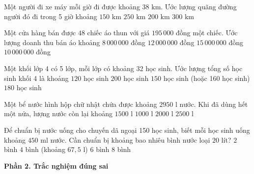 \begin{ex} %
Một người đi xe máy mỗi giờ đi được khoảng $38\text{ km}$. Ước lượng quãng đường người đó đi trong 5 giờ khoảng
\choice
{$150\text{ km}$}
{$250\text{ km}$}
{\True $200\text{ km}$}
{$300\text{ km}$}
\end{ex}

\begin{ex} %
Một cửa hàng bán được $48$ chiếc áo thun với giá $195\,000$ đồng một chiếc. Ước lượng doanh thu bán áo khoảng
\choice
{$8\,000\,000$ đồng}
{$12\,000\,000$ đồng}
{$15\,000\,000$ đồng}
{\True $10\,000\,000$ đồng}
\end{ex}

\begin{ex} %
Một khối lớp 4 có 5 lớp, mỗi lớp có khoảng 32 học sinh. Ước lượng tổng số học sinh khối 4 là khoảng
\choice
{$120$ học sinh}
{$200$ học sinh}
{\True $150$ học sinh (hoặc 160 học sinh)}
{$180$ học sinh}
\end{ex}

\begin{ex} %
Một bể nước hình hộp chữ nhật chứa được khoảng $2950\text{ l}$ nước. Khi đã dùng hết một nửa, lượng nước còn lại khoảng
\choice
{\True $1500\text{ l}$}
{$1000\text{ l}$}
{$2000\text{ l}$}
{$2500\text{ l}$}
\end{ex}

\begin{ex} %
Để chuẩn bị nước uống cho chuyến dã ngoại 150 học sinh, biết mỗi học sinh uống khoảng $450\text{ ml}$ nước. Cần chuẩn bị khoảng bao nhiêu bình nước loại $20$ lít?
\choice
{$2$ bình}
{\True $4$ bình (khoảng $67{,}5\text{ l}$)}
{$6$ bình}
{$8$ bình}
\end{ex}

\textbf{Phần 2. Trắc nghiệm đúng sai}

